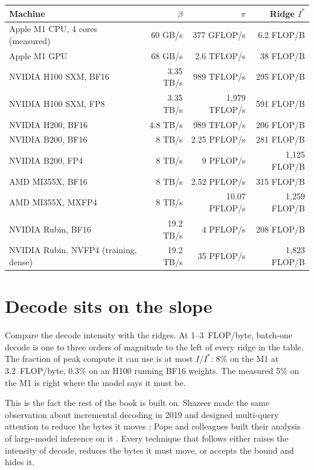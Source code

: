 \begin{center}
\begin{tabular}{@{}lrrr@{}}
\toprule
Machine & $\beta$ & $\pi$ & Ridge $I^{*}$ \\
\midrule
Apple M1 CPU, 4 cores (measured) & 60 GB/s & 377 GFLOP/s & 6.2 FLOP/B \\
Apple M1 GPU & 68 GB/s & 2.6 TFLOP/s & 38 FLOP/B \\
NVIDIA H100 SXM, BF16 & 3.35 TB/s & 989 TFLOP/s & 295 FLOP/B \\
NVIDIA H100 SXM, FP8 & 3.35 TB/s & 1,979 TFLOP/s & 591 FLOP/B \\
NVIDIA H200, BF16 & 4.8 TB/s & 989 TFLOP/s & 206 FLOP/B \\
NVIDIA B200, BF16 & 8 TB/s & 2.25 PFLOP/s & 281 FLOP/B \\
NVIDIA B200, FP4 & 8 TB/s & 9 PFLOP/s & 1,125 FLOP/B \\
AMD MI355X, BF16 & 8 TB/s & 2.52 PFLOP/s & 315 FLOP/B \\
AMD MI355X, MXFP4 & 8 TB/s & 10.07 PFLOP/s & 1,259 FLOP/B \\
NVIDIA Rubin, BF16 & 19.2 TB/s & 4 PFLOP/s & 208 FLOP/B \\
NVIDIA Rubin, NVFP4 (training, dense) & 19.2 TB/s & 35 PFLOP/s & 1,823 FLOP/B \\
\bottomrule
\end{tabular}
\end{center}

\section{Decode sits on the slope}

Compare the decode intensity with the ridges. At 1--3~FLOP/byte, batch-one
decode is one to three orders of magnitude to the left of every ridge in the
table. The fraction of peak compute it can use is at most $I/I^{*}$: 8\% on the
M1 at 3.2~FLOP/byte, 0.3\% on an H100 running BF16 weights. The measured 5\% on
the M1 is right where the model says it must be.

This is the fact the rest of the book is built on. Shazeer made the same
observation about incremental decoding in 2019 and designed multi-query
attention to reduce the bytes it moves \cite{shazeer2019mqa}; Pope and
colleagues built their analysis of large-model inference on it
\cite{pope2023scaling}. Every technique that follows either raises the
intensity of decode, reduces the bytes it must move, or accepts the bound and
hides it.

